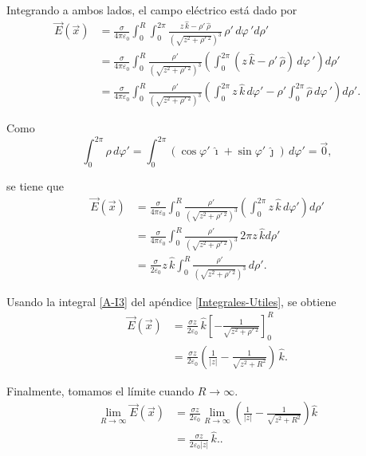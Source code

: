 \begin{ejemplo}
Integrando a ambos lados, el campo eléctrico está dado por
\begin{align*}
    \Vec{E}(\Vec{x}) &= \frac{\sigma}{4\pi \varepsilon_0} \int_0^R \int_0^{2\pi} \frac{z \,\hat{k} - \rho' \,\hat{\rho}}{\left( \sqrt{z^2 + \rho'\,^2} \right)^3} \,\rho' \,d\varphi\,' d\rho' \\
    &= \frac{\sigma}{4\pi \varepsilon_0} \int_0^R \frac{\rho'}{\left( \sqrt{z^2 + \rho'\,^2} \right)^3} \left(\int_0^{2\pi} (z \,\hat{k} - \rho' \,\hat{\rho} ) \,d\varphi\,' \right)d\rho' \\
    &= \frac{\sigma}{4\pi \varepsilon_0} \int_0^R \frac{\rho'}{\left( \sqrt{z^2 + \rho'\,^2} \right)^3} \left(\int_0^{2\pi} z \,\hat{k} \,d\varphi' - \rho' \int_0^{2\pi} \hat{\rho}  \,d\varphi\,' \right)d\rho' .
\end{align*}


Como 
$$\int_0^{2\pi} \hat{\rho} \,d\varphi' = \int_0^{2\pi} (\cos \varphi' \, \hat{\imath} + \sin \varphi'\,\hat{\jmath}) \, d\varphi' = \Vec{0},$$

se tiene que 
\begin{align*}
    \Vec{E}(\Vec{x}) &= \frac{\sigma}{4\pi \varepsilon_0} \int_0^R \frac{\rho'}{\left( \sqrt{z^2 + \rho'\,^2} \right)^3} \left(\int_0^{2\pi} z \,\hat{k} \,d\varphi'\right)d\rho' \\
    &= \frac{\sigma}{4\pi \varepsilon_0} \int_0^R \frac{\rho'}{\left( \sqrt{z^2 + \rho'\,^2} \right)^3} \, 2\pi z \, \hat{k} d\rho' \\
    &= \frac{\sigma}{2 \varepsilon_0} z \,\hat{k} \int_0^R\frac{\rho'}{\left( \sqrt{z^2 + \rho'\,^2} \right)^3} \,d\rho'.
\end{align*}

Usando la integral \eqref{A-I3} del apéndice \ref{Integrales-Utiles}, se obtiene
\begin{align*}
    \Vec{E}(\Vec{x}) &= \frac{\sigma z}{2 \varepsilon_0}  \,\hat{k} \left[ - \frac{1}{\sqrt{z^2 + \rho'\,^2}}\right]_0^R \\
    &= \frac{\sigma z}{2 \varepsilon_0}  \left(\frac{1}{|z|} - \frac{1}{\sqrt{z^2 + R^2}} \right) \,\hat{k}.
\end{align*}

Finalmente, tomamos el límite cuando $R \to \infty$.
\begin{align*}
    \lim_{R \to \infty} \Vec{E}(\Vec{x}) &= \frac{\sigma z}{2 \varepsilon_0}  \lim_{R\to \infty} \left(\frac{1}{|z|} - \frac{1}{\sqrt{z^2 + R^2}}\right) \hat{k} \\
    &= \frac{\sigma z}{2 \varepsilon_0 |z|} \,\hat{k}.  .
\end{align*}


\end{ejemplo}
